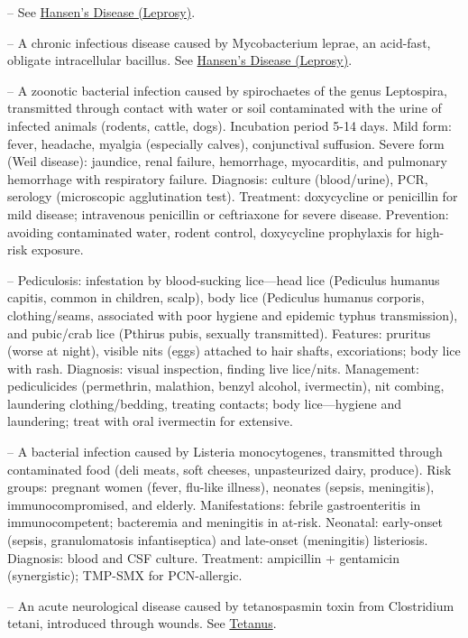 -- See \hyperlink{Hansen's Disease (Leprosy)}{Hansen's Disease (Leprosy)}.

-- A chronic infectious disease caused by Mycobacterium leprae, an acid-fast, obligate intracellular bacillus. See \hyperlink{Hansen's Disease (Leprosy)}{Hansen's Disease (Leprosy)}.

-- A zoonotic bacterial infection caused by spirochaetes of the genus Leptospira, transmitted through contact with water or soil contaminated with the urine of infected animals (rodents, cattle, dogs). Incubation period 5-14 days. Mild form: fever, headache, myalgia (especially calves), conjunctival suffusion. Severe form (Weil disease): jaundice, renal failure, hemorrhage, myocarditis, and pulmonary hemorrhage with respiratory failure. Diagnosis: culture (blood/urine), PCR, serology (microscopic agglutination test). Treatment: doxycycline or penicillin for mild disease; intravenous penicillin or ceftriaxone for severe disease. Prevention: avoiding contaminated water, rodent control, doxycycline prophylaxis for high-risk exposure.

-- Pediculosis: infestation by blood-sucking lice—head lice (Pediculus humanus capitis, common in children, scalp), body lice (Pediculus humanus corporis, clothing/seams, associated with poor hygiene and epidemic typhus transmission), and pubic/crab lice (Pthirus pubis, sexually transmitted). Features: pruritus (worse at night), visible nits (eggs) attached to hair shafts, excoriations; body lice with rash. Diagnosis: visual inspection, finding live lice/nits. Management: pediculicides (permethrin, malathion, benzyl alcohol, ivermectin), nit combing, laundering clothing/bedding, treating contacts; body lice—hygiene and laundering; treat with oral ivermectin for extensive.

-- A bacterial infection caused by Listeria monocytogenes, transmitted through contaminated food (deli meats, soft cheeses, unpasteurized dairy, produce). Risk groups: pregnant women (fever, flu-like illness), neonates (sepsis, meningitis), immunocompromised, and elderly. Manifestations: febrile gastroenteritis in immunocompetent; bacteremia and meningitis in at-risk. Neonatal: early-onset (sepsis, granulomatosis infantiseptica) and late-onset (meningitis) listeriosis. Diagnosis: blood and CSF culture. Treatment: ampicillin + gentamicin (synergistic); TMP-SMX for PCN-allergic.

-- An acute neurological disease caused by tetanospasmin toxin from Clostridium tetani, introduced through wounds. See \hyperlink{Tetanus}{Tetanus}.

